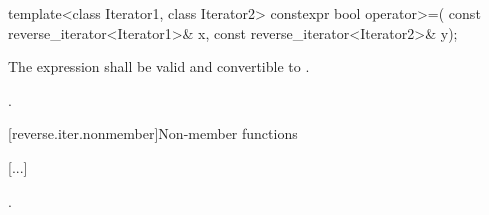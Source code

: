 %
\begin{itemdecl}
template<class Iterator1, class Iterator2>
  constexpr bool operator>=(
    const reverse_iterator<Iterator1>& x,
    const reverse_iterator<Iterator2>& y);
\end{itemdecl}

\begin{itemdescr}
{\color{newclr}
\pnum
\constraints
The expression  shall be valid and
convertible to .
} %

\pnum
\returns
{}.
\end{itemdescr}

[reverse.iter.nonmember]{Non-member functions}

[...]

\setcounter{Paras}{1}
\begin{itemdescr}
\pnum
\returns
{}.
\end{itemdescr}

